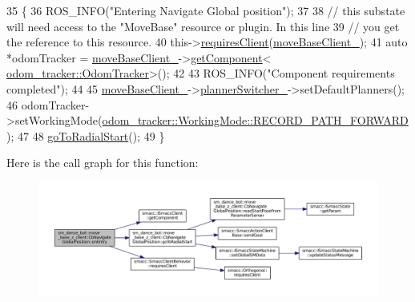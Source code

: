 \begin{DoxyCode}
35   \{
36     ROS\_INFO(\textcolor{stringliteral}{"Entering Navigate Global position"});
37 
38     \textcolor{comment}{// this substate will need access to the "MoveBase" resource or plugin. In this line}
39     \textcolor{comment}{// you get the reference to this resource.}
40     this->\hyperlink{classsmacc_1_1SmaccClientBehavior_a917f001e763a1059af337bf4e164f542}{requiresClient}(\hyperlink{classsm__dance__bot_1_1move__base__z__client_1_1CbNavigateGlobalPosition_a579eaa06b93cc396b2ff615a786c495f}{moveBaseClient\_});
41     \textcolor{keyword}{auto} *odomTracker = \hyperlink{classsm__dance__bot_1_1move__base__z__client_1_1CbNavigateGlobalPosition_a579eaa06b93cc396b2ff615a786c495f}{moveBaseClient\_}->\hyperlink{classsmacc_1_1ISmaccClient_adef78db601749ca63c19e74a27cb88cc}{getComponent}<
      \hyperlink{classodom__tracker_1_1OdomTracker}{odom\_tracker::OdomTracker}>();
42 
43     ROS\_INFO(\textcolor{stringliteral}{"Component requirements completed"});
44 
45     \hyperlink{classsm__dance__bot_1_1move__base__z__client_1_1CbNavigateGlobalPosition_a579eaa06b93cc396b2ff615a786c495f}{moveBaseClient\_}->\hyperlink{classsmacc_1_1ClMoveBaseZ_a712e0df77c9629930e03cbb4c539b485}{plannerSwitcher\_}->setDefaultPlanners();
46     odomTracker->setWorkingMode(\hyperlink{namespaceodom__tracker_a4daf27fd157b1a481fdfd6f90de00b88a989d06a586bcf9520889228da7faa643}{odom\_tracker::WorkingMode::RECORD\_PATH\_FORWARD}
      );
47 
48     \hyperlink{classsm__dance__bot_1_1move__base__z__client_1_1CbNavigateGlobalPosition_aa7e91d17625df52b94bb29a9cd1ae7e5}{goToRadialStart}();
49   \}
\end{DoxyCode}


Here is the call graph for this function\+:
\nopagebreak
\begin{figure}[H]
\begin{center}
\leavevmode
\includegraphics[width=350pt]{classsm__dance__bot_1_1move__base__z__client_1_1CbNavigateGlobalPosition_a8ad5cc3b238e6964043213f7dbead1dd_cgraph}
\end{center}
\end{figure}


